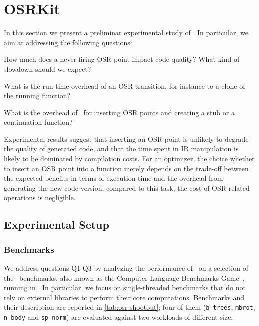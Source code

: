\section{OSRKit}
\label{se:eval-osrkit}

In this section we present a preliminar experimental study of \osrkit. In particular, we aim at addressing the following questions:

\begin{description}[labelindent=1em ,labelsep*=1em,leftmargin=3.5em,itemsep=3pt,parsep=3pt]
\item[Q1] How much does a never-firing OSR point impact code quality? What kind of slowdown should we expect?
\item[Q2] What is the run-time overhead of an OSR transition, for instance to a clone of the running function?
\item[Q3] What is the overhead of \osrkit\ for inserting OSR points and creating a stub or a continuation function?
\end{description}

\noindent Experimental results suggest that inserting an OSR point is unlikely to degrade the quality of generated code, and that the time spent in IR manipulation is likely to be dominated by compilation costs. For an optimizer, the choice whether to insert an OSR point into a function merely depends on the trade-off between the expected benefits in terms of execution time and the overhead from generating the new code version: compared to this task, the cost of OSR-related operations is negligible.

\subsection{Experimental Setup}

\subsubsection*{Benchmarks}
We address questions Q1-Q3 by analyzing the performance of \osrkit\ on a selection of the \shootout\ benchmarks, also known as the Computer Language Benchmarks Game~\cite{shootout}, running in \tinyvm. In particular, we focus on single-threaded benchmarks that do not rely on external libraries to perform their core computations. Benchmarks and their description are reported in \mytable\ref{tab:osr-shootout}; four of them ({\tt b-trees}, {\tt mbrot}, {\tt n-body} and {\tt sp-norm}) are evaluated against two workloads of different size.

